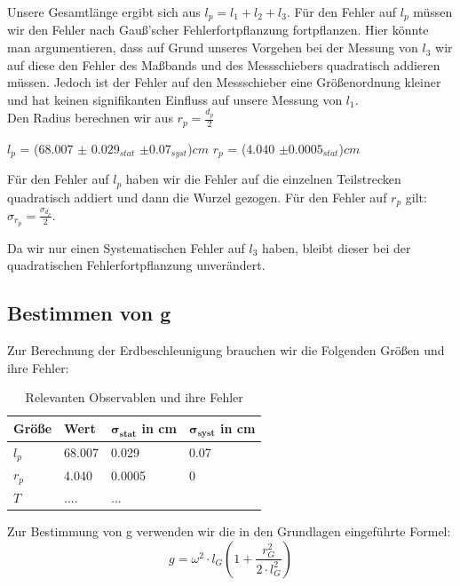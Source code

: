 \documentclass[twoside]{protokoll}
\begin{document}
Unsere Gesamtlänge ergibt sich aus $l_p = l_1 + l_2 + l_3$. Für den Fehler auf $l_p$ müssen wir den Fehler nach Gauß'scher Fehlerfortpflanzung fortpflanzen. 
Hier könnte man argumentieren, dass auf Grund unseres Vorgehen bei der Messung von $l_3$ wir auf diese den Fehler des Maßbands und des Messschiebers quadratisch addieren müssen.
Jedoch ist der Fehler auf den Messschieber eine Größenordnung kleiner und hat keinen signifikanten Einfluss auf unsere Messung von $l_1$.\\
Den Radius berechnen wir aus $r_p = \frac{d_p}{2}$
\begin{center}
$l_p$ = ($68.007$ $\pm$ $0.029_{stat}$ $\pm 0.07_{syst}$)$cm$   \qquad $r_p$ = ($4.040$ $\pm 0.0005_{stat}$)$cm$
\end{center}

Für den Fehler auf $l_p$ haben wir die Fehler auf die einzelnen Teilstrecken quadratisch addiert und dann die Wurzel gezogen.
Für den Fehler auf $r_p$  gilt: $\sigma_{r_p} =\frac{\sigma_{d_p}}{2}$.

Da wir nur einen Systematischen Fehler auf $l_3$ haben, bleibt dieser bei der quadratischen Fehlerfortpflanzung unverändert.

\subsection{Bestimmen von g}

Zur Berechnung der Erdbeschleunigung brauchen wir die Folgenden Größen und ihre Fehler:
 
\begin{table}[H]
        \centering
        \begin{tabularx}{1.0\textwidth}{X X X X} %
            \toprule
            \textbf{Größe} & \textbf{Wert} & $\mathbf{\sigma_{stat}}$ in cm & $\mathbf{\sigma_{syst}}$ in cm\\
            \midrule
            $l_p$ & 68.007 & 0.029 & 0.07 \\
            $r_p$ & 4.040 & 0.0005 & 0\\
            $T$ & ....& ...&\\
            \bottomrule
        \end{tabularx}
        \caption{Relevanten Observablen und ihre Fehler}
        \label{tab:längen un fehler}
    \end{table}
    
 Zur Bestimmung von g verwenden wir die in den Grundlagen eingeführte Formel:
\begin{equation}
    g = \omega^2 \cdot l_G \left( 1 + \frac{r_G^2}{2 \cdot l_G^2} \right)
    \label{eq:pendel_g}
\end{equation}
\end{document}
